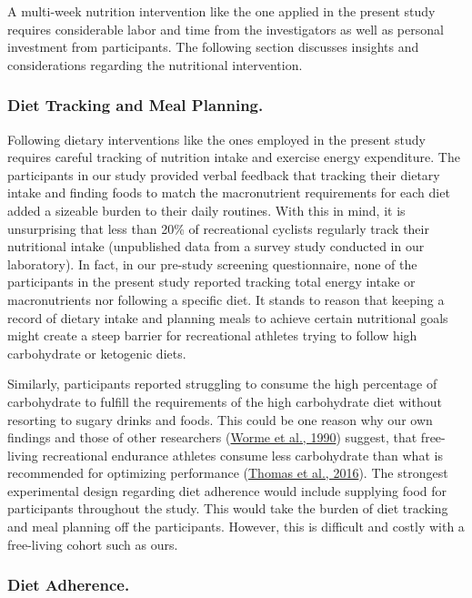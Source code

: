 \documentclass[]{cik}%
\begin{document}
A multi-week nutrition intervention like the one applied in the present
study requires considerable labor and time from the investigators as
well as personal investment from participants. The following section
discusses insights and considerations regarding the nutritional
intervention.

\hypertarget{diet-tracking-and-meal-planning.}{%
\subsubsection{Diet Tracking and Meal
Planning.}\label{diet-tracking-and-meal-planning.}}

Following dietary interventions like the ones employed in the present
study requires careful tracking of nutrition intake and exercise energy
expenditure. The participants in our study provided verbal feedback that
tracking their dietary intake and finding foods to match the
macronutrient requirements for each diet added a sizeable burden to
their daily routines. With this in mind, it is unsurprising that less
than 20\% of recreational cyclists regularly track their nutritional
intake (unpublished data from a survey study conducted in our
laboratory). In fact, in our pre-study screening questionnaire, none of
the participants in the present study reported tracking total energy
intake or macronutrients nor following a specific diet. It stands to
reason that keeping a record of dietary intake and planning meals to
achieve certain nutritional goals might create a steep barrier for
recreational athletes trying to follow high carbohydrate or ketogenic
diets.

Similarly, participants reported struggling to consume the high
percentage of carbohydrate to fulfill the requirements of the high
carbohydrate diet without resorting to sugary drinks and foods. This
could be one reason why our own findings and those of other researchers
(\protect\hyperlink{ref-58}{Worme et al., 1990}) suggest, that
free-living recreational endurance athletes consume less carbohydrate
than what is recommended for optimizing performance
(\protect\hyperlink{ref-1}{Thomas et al., 2016}). The strongest
experimental design regarding diet adherence would include supplying
food for participants throughout the study. This would take the burden
of diet tracking and meal planning off the participants. However, this
is difficult and costly with a free-living cohort such as ours.

\hypertarget{diet-adherence.}{%
\subsubsection{Diet Adherence.}\label{diet-adherence.}}
\end{document}
